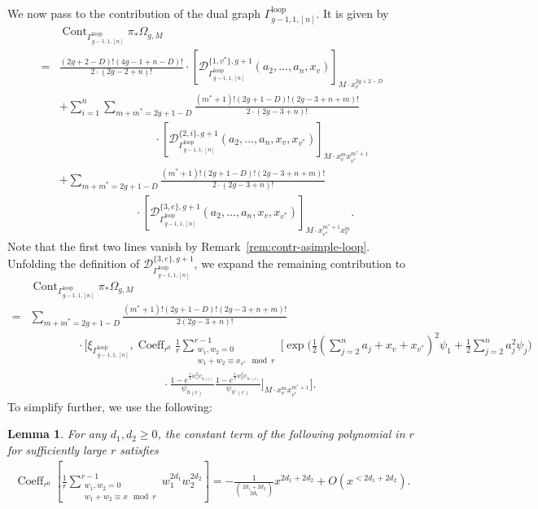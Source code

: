 \documentclass[12pt,reqno]{amsart}
\DeclareMathOperator{\Cont}{Cont}
\DeclareMathOperator{\Coeff}{Coeff}
\newcommand{\Gammaloop}{\Gamma^\mathrm{loop}}
\theoremstyle{plain}
\newtheorem{lemma}[theorem]{Lemma}
\theoremstyle{definition}
\theoremstyle{remark}
\begin{document}
We now pass to the contribution of the dual graph $\Gammaloop_{g-1, 1, [n]}$.
It is given by
\begin{align*}
  &\Cont_{\Gammaloop_{g-1,1,[n]}}\pi_*\Omega_{g,M}\\=& \frac{(2g + 2 - D)!(4g - 1 + n - D)!}{2 \cdot (2g - 2 + n)!} \cdot [\mathcal{D}^{\{1,v^*\}, g+1}_{\Gammaloop_{g-1, 1, [n]}}(a_2, \dotsc, a_n, x_v)]_{M \cdot x_v^{2g + 2 - D}} \\
  &+\sum_{i=1}^{n}\sum_{m + m^* = 2g + 1 - D}\frac{(m^* + 1)!(2g + 1 - D)!(2g - 3 + n + m)!}{2 \cdot (2g - 3 + n)!}
\\&\hspace{100pt}\cdot  [\mathcal{D}^{\{2,i\}, g+1}_{\Gammaloop_{g-1, 1, [n]}}(a_2, \dotsc, a_n, x_v, x_{v^*})]_{M \cdot x_v^m x_{v^*}^{m^* + 1}} \\
  &+ \sum_{m + m^* = 2g + 1 - D} \frac{(m^* + 1)!(2g + 1 - D)!(2g - 3 + n + m)!}{2 \cdot (2g - 3 + n)!} \\&\hspace{80pt}\cdot[\mathcal{D}^{\{3,e\}, g+1}_{\Gammaloop_{g-1, 1, [n]}}(a_2, \dotsc, a_n, x_v, x_{v^*})]_{M \cdot x_{v^*}^{m^* + 1} x_v^{m}}.
\end{align*}
Note that the first two lines vanish by Remark~\ref{rem:contr-asimple-loop}. Unfolding the definition of $\mathcal{D}^{\{3,e\}, g+1}_{\Gammaloop_{g-1, 1, [n]}}$, we expand the remaining contribution to 
\begin{align}\label{eqn:cont-g-1-[n]-0}
&\Cont_{\Gammaloop_{g-1,1,[n]}}\pi_*\Omega_{g,M}
\nonumber\\=&\sum_{m+m^*=2g+1-D}
\frac{(m^*+1)!(2g+1-D)!(2g-3+n+m)!}{2(2g-3+n)!}
\nonumber\\&\hspace{50pt}\cdot\Bigg[\xi_{\Gammaloop_{g-1,1,[n]}},\Coeff_{r^0}\frac{1}{r}\sum_{\substack{w_1,w_2=0\\w_1+w_2\equiv x_{v^*} \mod r}}^{r-1}\Bigg[\exp\Big(\frac{1}{2}(\sum_{j=2}^{n}a_j+x_v+x_{v^*})^2\psi_1+\frac{1}{2}\sum_{j=2}^{n}a_j^2\psi_j\Big)
\nonumber\\&\hspace{140pt}\cdot\frac{1-e^{\frac{1}{2}w_1^2\psi_{h(e)}}}{\psi_{h(e)}} \frac{1-e^{\frac{1}{2}w_2^2\psi_{h'(e)}}}{\psi_{h'(e)}}\Bigg]_{M\cdot x_v^{m}x_{v^*}^{m^*+1}}\Bigg].    
\end{align}
To simplify further, we use the following:
\begin{lemma}
  \label{lema:lim-w1-w2}
  For any $d_1,d_2\geq0$, the constant term of the following polynomial in $r$ for sufficiently large $r$ satisfies
\begin{align*}
\Coeff_{r^{0}}
\left[\frac{1}{r}\sum_{\substack{w_1,w_2=0\\
w_1+w_2\equiv x \mod r}}^{r-1}w_1^{2d_1}
	w_2^{2d_2}  \right]
	=-\frac{1}{\binom{2d_1+2d_2}{2d_1}}x^{2d_1+2d_2}+O(x^{< 2d_1+2d_2}).
\end{align*}
\end{lemma}
\end{document}
